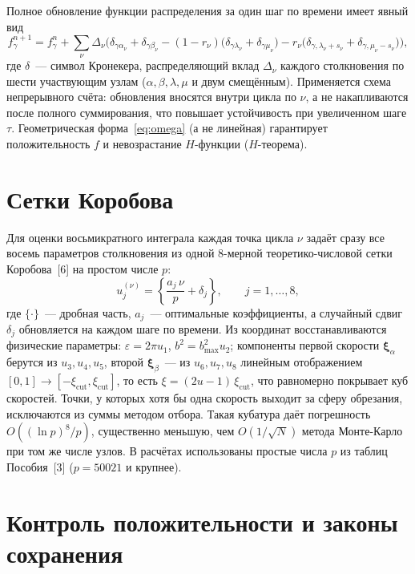 \documentclass[14pt,a4paper]{extreport}
\numberwithin{equation}{chapter}
\numberwithin{figure}{chapter}
\numberwithin{table}{chapter}
\newcommand{\xv}{\boldsymbol{\xi}}
\begin{document}
Полное обновление функции распределения за один шаг по времени имеет явный вид
\begin{equation}
  f_\gamma^{n+1}=f_\gamma^{n}+\sum_{\nu}\Delta_\nu\Big(\delta_{\gamma\alpha_\nu}+\delta_{\gamma\beta_\nu}
  -(1-r_\nu)\big(\delta_{\gamma\lambda_\nu}+\delta_{\gamma\mu_\nu}\big)
  -r_\nu\big(\delta_{\gamma,\lambda_\nu+s_\nu}+\delta_{\gamma,\mu_\nu-s_\nu}\big)\Big),
\end{equation}
где $\delta$~--- символ Кронекера, распределяющий вклад $\Delta_\nu$ каждого столкновения по шести участвующим узлам
($\alpha,\beta,\lambda,\mu$ и двум смещённым).
Применяется схема непрерывного счёта: обновления вносятся внутри цикла по $\nu$, а не накапливаются после полного
суммирования, что повышает устойчивость при увеличенном шаге $\tau$.
Геометрическая форма~\eqref{eq:omega} (а не линейная) гарантирует положительность $f$ и невозрастание $H$-функции
($H$-теорема).

\section{Сетки Коробова}

Для оценки восьмикратного интеграла каждая точка цикла $\nu$ задаёт сразу все восемь параметров столкновения из одной
8-мерной теоретико-числовой сетки Коробова~[6] на простом числе $p$:
\begin{equation}
  u_j^{(\nu)}=\left\{\frac{a_j\,\nu}{p}+\delta_j\right\},\qquad j=1,\dots,8,
\end{equation}
где $\{\cdot\}$~--- дробная часть, $a_j$~--- оптимальные коэффициенты, а случайный сдвиг $\delta_j$ обновляется на
каждом шаге по времени.
Из координат восстанавливаются физические параметры: $\varepsilon=2\pi u_1$, $b^2=b_{\max}^2 u_2$; компоненты первой
скорости $\xv_\alpha$ берутся из $u_3,u_4,u_5$, второй $\xv_\beta$~--- из $u_6,u_7,u_8$ линейным отображением
$[0,1]\to[-\xi_{\mathrm{cut}},\xi_{\mathrm{cut}}]$, то есть $\xi=(2u-1)\,\xi_{\mathrm{cut}}$, что равномерно покрывает
куб скоростей.
Точки, у которых хотя бы одна скорость выходит за сферу обрезания, исключаются из суммы методом отбора.
Такая кубатура даёт погрешность $O\!\left((\ln p)^8/p\right)$, существенно меньшую, чем $O\left(1/\sqrt{N}\right)$
метода Монте-Карло при том же числе узлов.
В расчётах использованы простые числа $p$ из таблиц Пособия~[3] ($p=50021$ и крупнее).

\section{Контроль положительности и законы сохранения}
\end{document}
